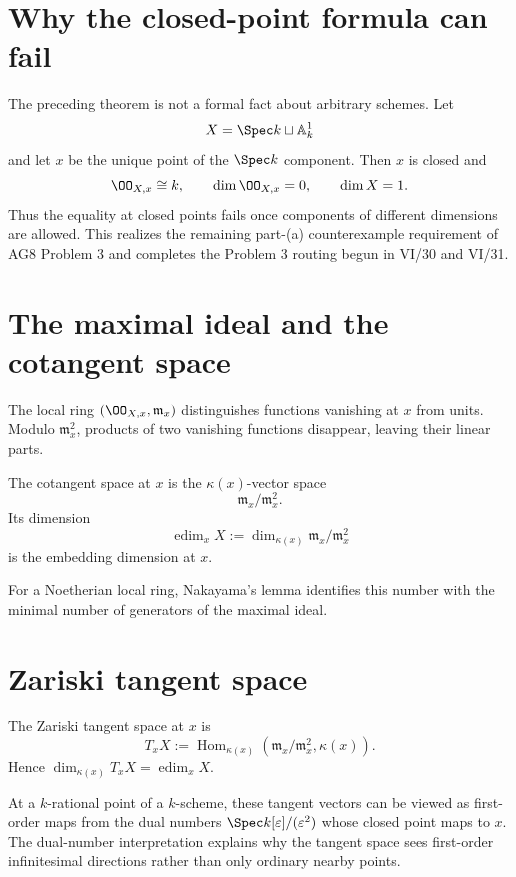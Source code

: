 \section{Why the closed-point formula can fail}\label{sec:vi32-counterexample}
The preceding theorem is not a formal fact about arbitrary schemes. Let
\[
 X=\Spec k\sqcup\mathbb A^1_k
\]
and let $x$ be the unique point of the $\Spec k$ component. Then $x$ is closed and
\[
 \OO_{X,x}\cong k,
 \qquad
 \dim\OO_{X,x}=0,
 \qquad
 \dim X=1.
\]
Thus the equality at closed points fails once components of different dimensions are allowed.  This realizes the
remaining part-(a) counterexample requirement of AG8 Problem 3 and completes the Problem 3 routing begun in VI/30 and
VI/31.


\section{The maximal ideal and the cotangent space}\label{sec:vi32-cotangent}
The local ring $(\OO_{X,x},\mathfrak m_x)$ distinguishes functions vanishing at $x$ from units.  Modulo
$\mathfrak m_x^2$, products of two vanishing functions disappear, leaving their linear parts.
\begin{definition}\label{def:vi32-embed-dim}
The cotangent space at $x$ is the $\kappa(x)$-vector space
\[
 \mathfrak m_x/\mathfrak m_x^2.
\]
Its dimension
\[
 \operatorname{edim}_xX:=\dim_{\kappa(x)}\mathfrak m_x/\mathfrak m_x^2
\]
is the embedding dimension at $x$.
\end{definition}
For a Noetherian local ring, Nakayama's lemma identifies this number with the minimal number of generators of the maximal
ideal.


\section{Zariski tangent space}\label{sec:vi32-tangent}
\begin{definition}\label{def:vi32-zariski-tangent}
The Zariski tangent space at $x$ is
\[
 T_xX:=\operatorname{Hom}_{\kappa(x)}(\mathfrak m_x/\mathfrak m_x^2,\kappa(x)).
\]
Hence $\dim_{\kappa(x)}T_xX=\operatorname{edim}_xX$.
\end{definition}
At a $k$-rational point of a $k$-scheme, these tangent vectors can be viewed as first-order maps from the dual numbers
$\Spec k[\varepsilon]/(\varepsilon^2)$ whose closed point maps to $x$.  The dual-number interpretation explains why the
tangent space sees first-order infinitesimal directions rather than only ordinary nearby points.


